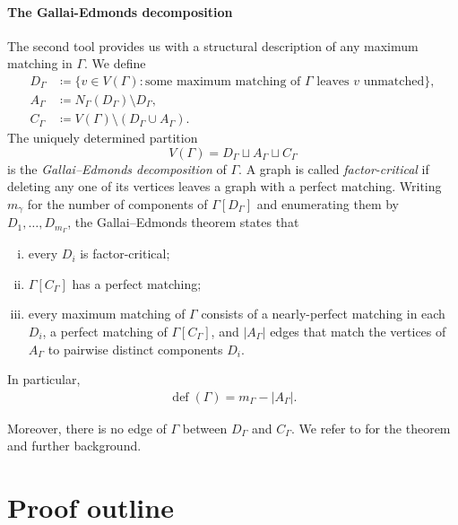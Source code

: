 \documentclass[10pt,a4paper]{article}
\newcommand{\defi}{\operatorname{def}}
\begin{document}
\paragraph{The Gallai-Edmonds decomposition} \label{s:Gallai}
The second tool provides us with a structural description of any maximum matching in $\Gamma$. We define
\begin{align*}
 D_\Gamma&\coloneqq\{v\in V(\Gamma):\text{some maximum matching of $\Gamma$ leaves $v$ unmatched}\},\\
 A_\Gamma&\coloneqq N_\Gamma(D_\Gamma)\setminus D_\Gamma,\\
 C_\Gamma&\coloneqq V(\Gamma)\setminus(D_\Gamma\cup A_\Gamma).
\end{align*}
The uniquely determined partition
\[
 V(\Gamma)=D_\Gamma\sqcup A_\Gamma\sqcup C_\Gamma
\]
is the \emph{Gallai--Edmonds decomposition} of $\Gamma$.
A graph is called \emph{factor-critical} if deleting any one of its vertices leaves a graph with a perfect matching.
Writing $m_{\gamma}$ for the number of components of $\Gamma[D_\Gamma]$ and enumerating them by $D_1,\ldots,D_{m_\Gamma}$, the Gallai--Edmonds theorem \cite{edmonds1965paths,gallai1964maximale} states that
\begin{enumerate}[(i)]
 \item every $D_i$ is factor-critical;
 \item $\Gamma[C_\Gamma]$ has a perfect matching;
 \item every maximum matching of $\Gamma$ consists of a nearly-perfect matching in each $D_i$, a perfect matching of $\Gamma[C_\Gamma]$, and $|A_\Gamma|$ edges that match the vertices of $A_\Gamma$ to pairwise distinct components $D_i$.
\end{enumerate}
In particular,
\begin{align*} \label{eq:Gallai-Edmonds}
     \defi(\Gamma)=m_\Gamma-|A_\Gamma|.
\end{align*}

Moreover, there is no edge of $\Gamma$ between $D_\Gamma$ and $C_\Gamma$.
We refer to \cite[Chapter~3]{LP86} for the theorem and further background.




\section{Proof outline}\label{s:outline}
\end{document}
